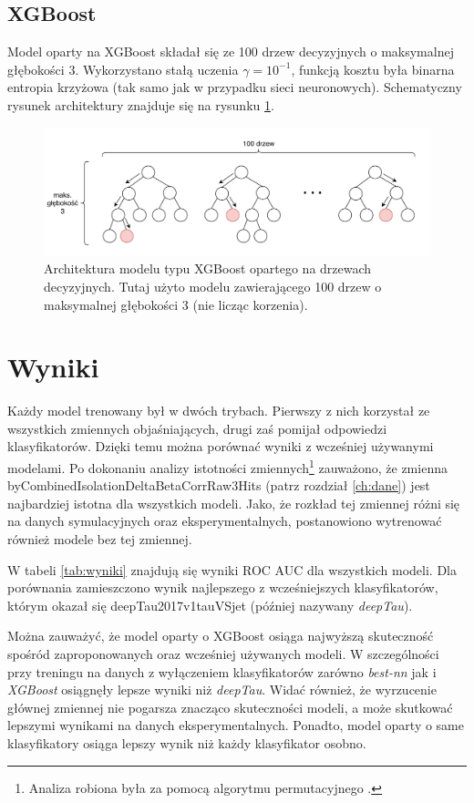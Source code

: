 \documentclass{pracalicmgr}
\begin{document}
	
	\section{XGBoost}
	Model oparty na XGBoost składał się ze 100 drzew decyzyjnych o maksymalnej głębokości 3. Wykorzystano stałą uczenia $\gamma = 10^{-1}$, funkcją kosztu była binarna entropia krzyżowa (tak samo jak w przypadku sieci neuronowych). Schematyczny rysunek architektury znajduje się na rysunku \ref{fig:xgb}.
	
	\begin{figure}[H]
	\centering
	\includegraphics[width=1.0\textwidth]{xgb.pdf}
	\caption{Architektura modelu typu XGBoost opartego na drzewach decyzyjnych. Tutaj użyto modelu zawierającego 100 drzew o maksymalnej głębokości 3 (nie licząc korzenia).}
	\label{fig:xgb}
	\end{figure}
    
    \chapter{Wyniki}
    Każdy model trenowany był w dwóch trybach. Pierwszy z nich korzystał ze wszystkich zmiennych objaśniających, drugi zaś pomijał odpowiedzi klasyfikatorów. Dzięki temu można porównać wyniki z wcześniej używanymi modelami. Po dokonaniu analizy istotności zmiennych\footnote{Analiza robiona była za pomocą algorytmu permutacyjnego \cite{breiman2001random}.} zauważono, że zmienna byCombinedIsolationDeltaBetaCorrRaw3Hits (patrz rozdział \ref{ch:dane}) jest najbardziej istotna dla wszystkich modeli. Jako, że rozkład tej zmiennej różni się na danych symulacyjnych oraz eksperymentalnych, postanowiono wytrenować również modele bez tej zmiennej.
    
	W tabeli \ref{tab:wyniki} znajdują się wyniki ROC AUC dla wszystkich modeli. Dla porównania zamieszczono wynik najlepszego z wcześniejszych klasyfikatorów, którym okazał się deepTau2017v1tauVSjet (później nazywany \textit{deepTau}). 
	
	Można zauważyć, że model oparty o XGBoost osiąga najwyższą skuteczność spośród zaproponowanych oraz wcześniej używanych modeli. W szczególności przy treningu na danych z wyłączeniem klasyfikatorów zarówno \textit{best-nn} jak i \textit{XGBoost} osiągnęły lepsze wyniki niż \textit{deepTau}. Widać również, że wyrzucenie głównej zmiennej nie pogarsza znacząco skuteczności modeli, a może skutkować lepszymi wynikami na danych eksperymentalnych. Ponadto, model oparty o same klasyfikatory osiąga lepszy wynik niż każdy klasyfikator osobno.
	
\end{document}
